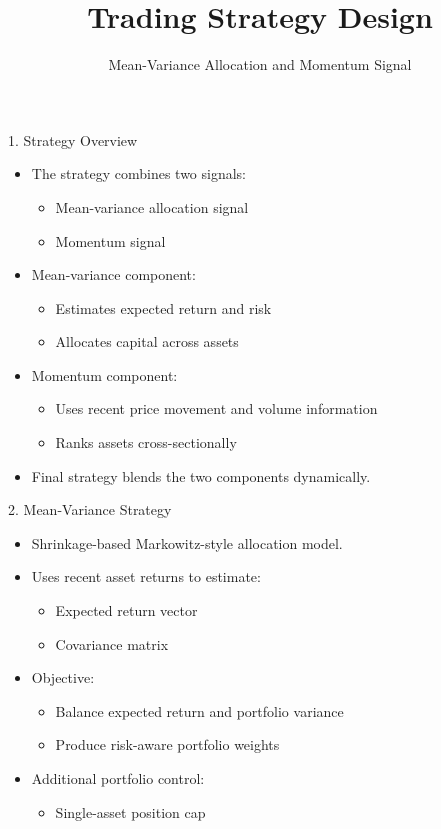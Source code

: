 \documentclass[aspectratio=169]{beamer}
\title{Trading Strategy Design}
\subtitle{Mean-Variance Allocation and Momentum Signal}
\author{}
\date{}
\begin{document}
\begin{frame}
  \titlepage
\end{frame}

\begin{frame}{1. Strategy Overview}
  \begin{itemize}
    \item The strategy combines two signals:
    \begin{itemize}
      \item Mean-variance allocation signal
      \item Momentum signal
    \end{itemize}
    \item Mean-variance component:
    \begin{itemize}
      \item Estimates expected return and risk
      \item Allocates capital across assets
    \end{itemize}
    \item Momentum component:
    \begin{itemize}
      \item Uses recent price movement and volume information
      \item Ranks assets cross-sectionally
    \end{itemize}
    \item Final strategy blends the two components dynamically.
  \end{itemize}
\end{frame}

\begin{frame}{2. Mean-Variance Strategy}
  \begin{itemize}
    \item Shrinkage-based Markowitz-style allocation model.
    \item Uses recent asset returns to estimate:
    \begin{itemize}
      \item Expected return vector
      \item Covariance matrix
    \end{itemize}
    \item Objective:
    \begin{itemize}
      \item Balance expected return and portfolio variance
      \item Produce risk-aware portfolio weights
    \end{itemize}
    \item Additional portfolio control:
    \begin{itemize}
      \item Single-asset position cap
    \end{itemize}
  \end{itemize}
\end{frame}
\end{document}
